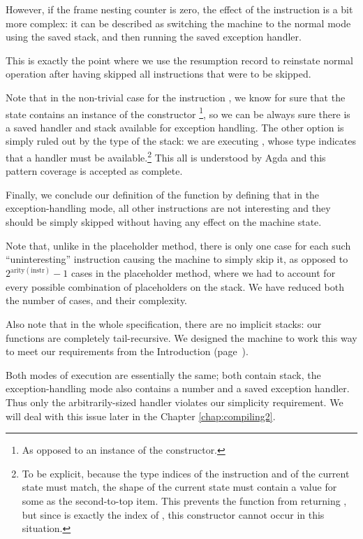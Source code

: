 However, if the frame nesting counter is zero, the effect of the instruction
 is a bit more complex: it can be described as switching the
machine to the normal mode using the saved stack, and then running the
saved exception handler.

This is exactly the point where we use the resumption record to reinstate
normal operation after having skipped all instructions that were to be skipped.

Note that in the non-trivial case for the instruction , we know
for sure that the state contains an instance of the  constructor%
\footnote{As opposed to an instance of the  constructor.}, so
we can be always sure there is a saved handler and stack available for
exception handling. The other option is simply ruled out by the type of the
stack: we are executing , whose type indicates that a handler
must be available.\footnote{To be explicit, because the type indices of the
	instruction  and of the current state must match, the shape
	of the current state must contain a value  for some 
	as the second-to-top item.  This prevents the function 
from returning , but since  is exactly the index
of , this constructor cannot occur in this situation.} This all
is understood by Agda and this pattern coverage is accepted as complete.

Finally, we conclude our definition of the function  by
defining that in the exception-handling mode, all other instructions are not
interesting and they should be simply skipped without having any effect on the
machine state.

Note that, unlike in the placeholder method, there is only one case for each
such ``uninteresting'' instruction causing the machine to simply skip it, as
opposed to $2^{\mathrm{arity(instr)}} - 1$ cases in the placeholder method,
where we had to account for every possible combination of placeholders on the
stack. We have reduced both the number of cases, and their complexity.

Also note that in the whole specification, there are no implicit stacks: our
functions are completely tail-recursive. We designed the machine to work this
way to meet our requirements from the Introduction (page~\pageref{objectives}).

Both modes of execution are essentially the same; both contain stack, the
exception-handling mode also contains a number and a saved exception handler.
Thus only the arbitrarily-sized handler violates our simplicity requirement.
We will deal with this issue later in the Chapter \ref{chap:compiling2}.


